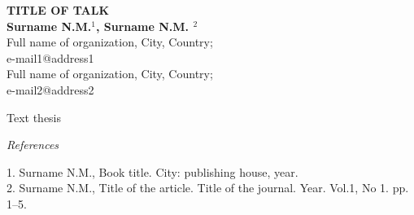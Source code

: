 \documentclass[a4paper,11pt]{article}
\begin{document}
\large
\makeatletter
\renewcommand{\@evenhead}{\vbox{\thepage\hfil{\verb "Surname .N.M."}\hrule}}
\renewcommand{\@oddhead}{\vbox{\hfill{\verb " Actual Problems of Stochastic Analysis
"}
\hfill\thepage\hrule}} \makeatother
\begin{center}
\textbf{TITLE OF TALK }\\
\medskip
\textbf{Surname N.M.$^{1}$, Surname N.M. $^{2}$}\\
\smallskip
{Full name of organization, City, Country;}\\
{e-mail1@address1}\\
{ Full name of organization, City, Country;}\\
{e-mail2@address2}
\end{center}
\label{S.N.M}
Text thesis
%


\begin{center}
\textsl{References}
\end{center}
{1.} Surname N.M., Book title. City: publishing house, year.\\
{2.} Surname N.M., Title of the article. Title of the journal. Year. Vol.1, No 1. pp. 1--5.
\end{document}
